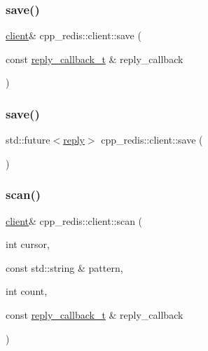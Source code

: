 \mbox{\label{classcpp__redis_1_1client_a01987f9fb419cfbce81872be8cd17619}} 
\subsubsection{\texorpdfstring{save()}{save()}\hspace{0.1cm}{\footnotesize\ttfamily [1/2]}}
{\footnotesize\ttfamily \hyperlink{classcpp__redis_1_1client}{client}\& cpp\+\_\+redis\+::client\+::save (\begin{DoxyParamCaption}\item[{const \hyperlink{classcpp__redis_1_1client_a061a1140d36d2eaeda82b09a0bb3f9f2}{reply\+\_\+callback\+\_\+t} \&}]{reply\+\_\+callback }\end{DoxyParamCaption})}

\mbox{\label{classcpp__redis_1_1client_a40f28e53d89e46aff3df4670736b1034}} 
\subsubsection{\texorpdfstring{save()}{save()}\hspace{0.1cm}{\footnotesize\ttfamily [2/2]}}
{\footnotesize\ttfamily std\+::future$<$\hyperlink{classcpp__redis_1_1reply}{reply}$>$ cpp\+\_\+redis\+::client\+::save (\begin{DoxyParamCaption}{ }\end{DoxyParamCaption})}

\mbox{\label{classcpp__redis_1_1client_a3c4a8cc50f4e2152c7c79e876bf73294}} 
\subsubsection{\texorpdfstring{scan()}{scan()}\hspace{0.1cm}{\footnotesize\ttfamily [1/2]}}
{\footnotesize\ttfamily \hyperlink{classcpp__redis_1_1client}{client}\& cpp\+\_\+redis\+::client\+::scan (\begin{DoxyParamCaption}\item[{int}]{cursor,  }\item[{const std\+::string \&}]{pattern,  }\item[{int}]{count,  }\item[{const \hyperlink{classcpp__redis_1_1client_a061a1140d36d2eaeda82b09a0bb3f9f2}{reply\+\_\+callback\+\_\+t} \&}]{reply\+\_\+callback }\end{DoxyParamCaption})}

